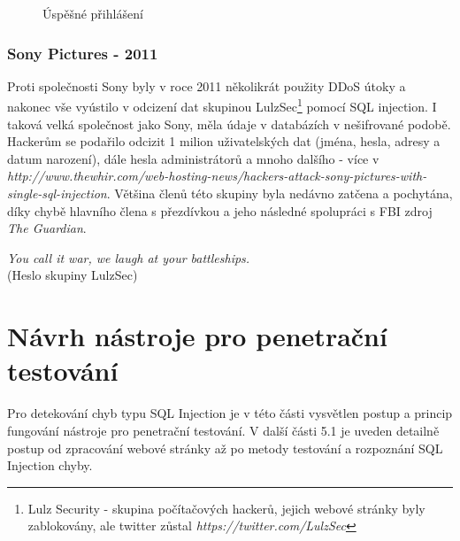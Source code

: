 \documentclass[12pt, a4paper]{report}
\begin{document}
\begin{figure}[h!]
\caption{Úspěšné přihlášení}
\label{obr.login2}
\end{figure}


\subsection{Sony Pictures - 2011}
Proti společnosti Sony byly v roce 2011 několikrát použity DDoS útoky a nakonec vše vyústilo v odcizení dat skupinou LulzSec\footnote{Lulz Security - skupina počítačových hackerů, jejich webové stránky byly zablokovány, ale twitter zůstal \textit{https://twitter.com/LulzSec}} pomocí SQL injection. I taková velká společnost jako Sony, měla údaje v databázích v nešifrované podobě. Hackerům se podařilo odcizit 1 milion uživatelských dat (jména, hesla, adresy a datum narození), dále hesla administrátorů a mnoho dalšího - více v \textit{http://www.thewhir.com/web-hosting-news/hackers-attack-sony-pictures-with-single-sql-injection}. Většina členů této skupiny byla nedávno zatčena a pochytána, díky chybě hlavního člena s přezdívkou  a jeho následné spolupráci s FBI zdroj \textit{The Guardian}\cite{guardian}.

\begin{center}
\textit{You call it war, we laugh at your battleships.}\\
(Heslo skupiny LulzSec)
\end{center}

\chapter{Návrh nástroje pro penetrační testování}
Pro detekování chyb typu SQL Injection je v této části vysvětlen postup a princip fungování nástroje pro penetrační testování. V další části 5.1 je uveden detailně postup od zpracování webové stránky až po metody testování a rozpoznání SQL Injection chyby.
\end{document}
